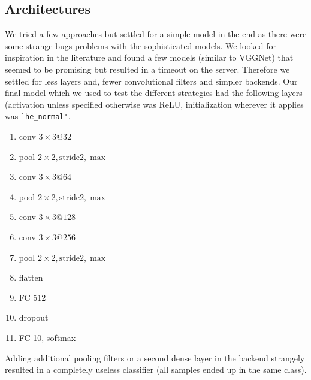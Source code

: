 \subsection{Architectures}\label{sec:a}
We tried a few approaches but settled for a simple model in the end as there were some strange bugs problems with the sophisticated models. We looked for inspiration in the literature and found a few models (similar to VGGNet) that seemed to be promising but resulted in a timeout on the server. Therefore we settled for less layers and, fewer convolutional filters and simpler backends. 
Our final model which we used to test the different strategies had the following layers (activation unless specified otherwise was ReLU, initialization wherever it applies was \lstinline{`he_normal'}.
\begin{enumerate}
\item conv $3\times 3@32$
\item pool $2\times 2, \text{stride} 2, \max$
\item conv $3\times 3@64$
\item pool $2\times 2, \text{stride} 2, \max$
\item conv $3\times 3@128$
\item conv $3\times 3@256$
\item pool $2\times 2, \text{stride} 2, \max$
\item flatten
\item FC 512
\item dropout
\item FC 10, softmax
\end{enumerate}

Adding additional pooling filters or a second dense layer in the backend strangely resulted in a completely useless classifier (all samples ended up in the same class).



